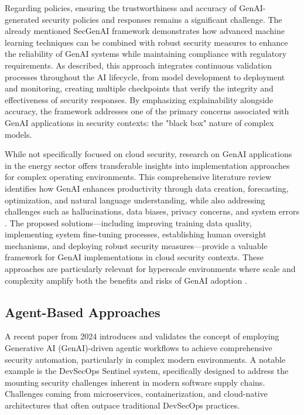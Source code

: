 Regarding policies, ensuring the trustworthiness and accuracy of GenAI-generated security policies and responses remains a significant challenge. The already mentioned SecGenAI framework demonstrates how advanced machine learning techniques can be combined with robust security measures to enhance the reliability of GenAI systems while maintaining compliance with regulatory requirements.\cite{haryanto_secgenai_2024}
As described, this approach integrates continuous validation processes throughout the AI lifecycle, from model development to deployment and monitoring, creating multiple checkpoints that verify the integrity and effectiveness of security responses. By emphasizing explainability alongside accuracy, the framework addresses one of the primary concerns associated with GenAI applications in security contexts: the "black box" nature of complex models.\cite{haryanto_secgenai_2024}

While not specifically focused on cloud security, research on GenAI applications in the energy sector offers transferable insights into implementation approaches for complex operating environments. This comprehensive literature review identifies how GenAI enhances productivity through data creation, forecasting, optimization, and natural language understanding, while also addressing challenges such as hallucinations, data biases, privacy concerns, and system errors \cite{surathunmanun_exploring_2024}.
The proposed solutions—including improving training data quality, implementing system fine-tuning processes, establishing human oversight mechanisms, and deploying robust security measures—provide a valuable framework for GenAI implementations in cloud security contexts. These approaches are particularly relevant for hyperscale environments where scale and complexity amplify both the benefits and risks of GenAI adoption \cite{surathunmanun_exploring_2024}.


\subsection{Agent-Based Approaches} %
\label{sec:Agent-Based Approaches}

A recent paper from 2024 introduces and validates the concept of employing Generative AI (GenAI)-driven agentic workflows to achieve comprehensive security automation, particularly in complex modern environments. A notable example is the DevSecOps Sentinel system\cite{noauthor_devsecops_nodate}, specifically designed to address the mounting security challenges inherent in modern software supply chains. Challenges coming from microservices, containerization, and cloud-native architectures that often outpace traditional DevSecOps practices\cite{noauthor_devsecops_nodate}.

